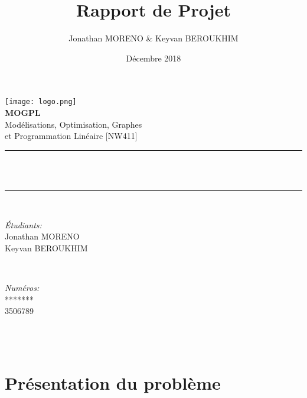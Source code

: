 \documentclass[12pt]{article}
\title{Rapport de Projet}
\author{Jonathan MORENO \& Keyvan BEROUKHIM}
\date{Décembre 2018}
\makeatletter
\let\thetitle\@title
\let\thedate\@date
\makeatother
\begin{document}
\begin{titlepage}
	\centering
    \vspace{0.5 cm}
    \texttt{[image: logo.png]}\\[1.5 cm]
    \textbf{\LARGE MOGPL}\\[0.5 cm]
    \Large{Modélisations, Optimisation, Graphes\\et Programmation Linéaire}
    \large{[NW411]}\\[0.5 cm]
	\rule{\linewidth}{0.2 mm} \\[0.4 cm]
	{\Huge{\bfseries \thetitle}}\\
	\rule{\linewidth}{0.2 mm} \\[1.5 cm]
	
	\begin{minipage}{0.4\textwidth}
		\begin{flushleft} \large
			\emph{Étudiants:}\\
			Jonathan MORENO\\
			Keyvan BEROUKHIM
			\end{flushleft}
			\end{minipage}~
			\begin{minipage}{0.4\textwidth}
			\begin{flushright} \large
			\emph{Numéros:} \\
			*******\\
			3506789
		\end{flushright}
	\end{minipage}\\[2 cm]
	{\large \thedate}\\[2 cm]
	\vfill
\end{titlepage}

\section{Présentation du problème}
\end{document}
